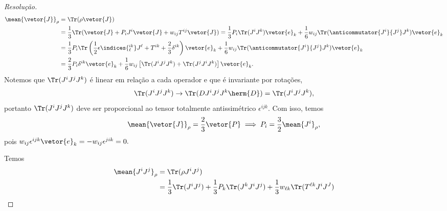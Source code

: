 \begin{proof}[Resolução]
    \begin{align*}
        \mean{\vetor{J}}_\rho &= \Tr( \rho \vetor{J})\\
                              &= \frac13 \Tr(\vetor{J} + P_i J^i \vetor{J} + w_{ij} T^{ij} \vetor{J}) = \frac13 P_i \Tr(J^i J^k) \vetor{e}_k + \frac16 w_{ij} \Tr(\anticommutator{J^i}{J^j}J^k) \vetor{e}_k\\
                              &= \frac13 P_i \Tr\left(\frac12 \epsilon\indices{^{ik}_\ell}J^\ell + T^{ik} + \frac23 \delta^{ik}\right)\vetor{e}_k + \frac16 w_{ij} \Tr(\anticommutator{J^i}{J^j}J^k)\vetor{e}_k\\
                              &= \frac23 P_i \delta^{ik} \vetor{e}_k + \frac16 w_{ij} \left[\Tr(J^i J^j J^k) + \Tr(J^j J^i J^k)\right] \vetor{e}_k.
    \end{align*}
    Notemos que \(\Tr(J^i J^j J^k)\) é linear em relação a cada operador e que é invariante por rotações,
    \begin{equation*}
        \Tr(J^i J^j J^k) \to \Tr(D J^i J^j J^k \herm{D}) = \Tr(J^i J^j J^k),
    \end{equation*}
    portanto \(\Tr(J^i J^j J^k)\) deve ser proporcional ao tensor totalmente antissimétrico \(\epsilon^{ijk}.\) Com isso, temos
    \begin{equation*}
        \mean{\vetor{J}}_{\rho} = \frac23 \vetor{P} \implies P_i = \frac32 \mean{J^i}_\rho,
    \end{equation*}
    pois \(w_{ij} \epsilon^{ijk} \vetor{e}_k = - w_{ij} \epsilon^{jik} = 0.\) 

    Temos
    \begin{align*}
        \mean{J^i J^j}_{\rho} &= \Tr(\rho J^i J^j)\\
                              &= \frac13 \Tr(J^i J^j) + \frac13 P_k \Tr(J^k J^i J^j) + \frac13 w_{\ell k} \Tr(T^{\ell k} J^i J^J)
    \end{align*}
\end{proof}
